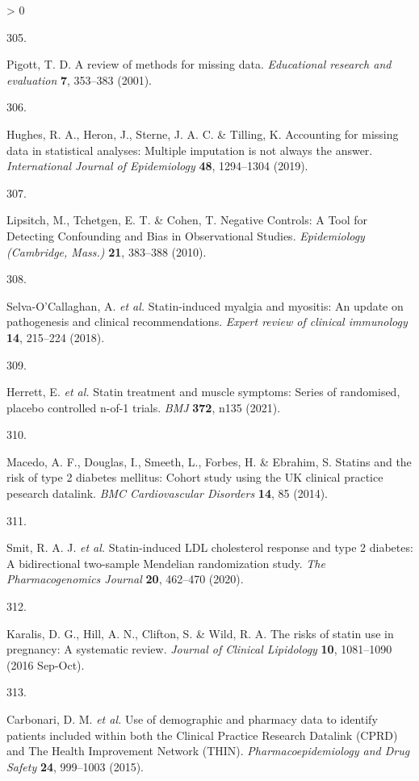 \documentclass[a4paper, twoside]{templates/ociamthesis}
\newlength{\cslhangindent}
\newlength{\csllabelwidth}
\newenvironment{CSLReferences}[3] %
 {%
  \setlength{\parindent}{0pt}
  \ifodd #1 \everypar{\setlength{\hangindent}{\cslhangindent}}\ignorespaces\fi
  \ifnum #2 > 0
  \setlength{\parskip}{#2\baselineskip}
  \fi
 }%
 {}
\newcommand{\CSLLeftMargin}[1]{\parbox[t]{\maxof{\widthof{#1}}{\csllabelwidth}}{#1}}
\newcommand{\CSLRightInline}[1]{\parbox[t]{\linewidth - \csllabelwidth}{#1}}
\begin{document}
\begin{CSLReferences}{0}{0}
\leavevmode\hypertarget{ref-pigott2001}{}%
\CSLLeftMargin{305. }
\CSLRightInline{Pigott, T. D. A review of methods for missing data. \emph{Educational research and evaluation} \textbf{7}, 353--383 (2001).}

\leavevmode\hypertarget{ref-hughes2019}{}%
\CSLLeftMargin{306. }
\CSLRightInline{Hughes, R. A., Heron, J., Sterne, J. A. C. \& Tilling, K. Accounting for missing data in statistical analyses: Multiple imputation is not always the answer. \emph{International Journal of Epidemiology} \textbf{48}, 1294--1304 (2019).}

\leavevmode\hypertarget{ref-lipsitch2010}{}%
\CSLLeftMargin{307. }
\CSLRightInline{Lipsitch, M., Tchetgen, E. T. \& Cohen, T. Negative {Controls}: A {Tool} for {Detecting Confounding} and {Bias} in {Observational Studies}. \emph{Epidemiology (Cambridge, Mass.)} \textbf{21}, 383--388 (2010).}

\leavevmode\hypertarget{ref-selva-ocallaghan2018}{}%
\CSLLeftMargin{308. }
\CSLRightInline{Selva-O'Callaghan, A. \emph{et al.} Statin-induced myalgia and myositis: An update on pathogenesis and clinical recommendations. \emph{Expert review of clinical immunology} \textbf{14}, 215--224 (2018).}

\leavevmode\hypertarget{ref-herrett2021}{}%
\CSLLeftMargin{309. }
\CSLRightInline{Herrett, E. \emph{et al.} Statin treatment and muscle symptoms: Series of randomised, placebo controlled n-of-1 trials. \emph{BMJ} \textbf{372}, n135 (2021).}

\leavevmode\hypertarget{ref-macedo2014}{}%
\CSLLeftMargin{310. }
\CSLRightInline{Macedo, A. F., Douglas, I., Smeeth, L., Forbes, H. \& Ebrahim, S. Statins and the risk of type 2 diabetes mellitus: Cohort study using the {UK} clinical practice pesearch datalink. \emph{BMC Cardiovascular Disorders} \textbf{14}, 85 (2014).}

\leavevmode\hypertarget{ref-smit2020}{}%
\CSLLeftMargin{311. }
\CSLRightInline{Smit, R. A. J. \emph{et al.} Statin-induced {LDL} cholesterol response and type 2 diabetes: A bidirectional two-sample {Mendelian} randomization study. \emph{The Pharmacogenomics Journal} \textbf{20}, 462--470 (2020).}

\leavevmode\hypertarget{ref-karalis2016}{}%
\CSLLeftMargin{312. }
\CSLRightInline{Karalis, D. G., Hill, A. N., Clifton, S. \& Wild, R. A. The risks of statin use in pregnancy: A systematic review. \emph{Journal of Clinical Lipidology} \textbf{10}, 1081--1090 (2016 Sep-Oct).}

\leavevmode\hypertarget{ref-carbonari2015}{}%
\CSLLeftMargin{313. }
\CSLRightInline{Carbonari, D. M. \emph{et al.} Use of demographic and pharmacy data to identify patients included within both the {Clinical Practice Research Datalink} ({CPRD}) and {The Health Improvement Network} ({THIN}). \emph{Pharmacoepidemiology and Drug Safety} \textbf{24}, 999--1003 (2015).}


\end{CSLReferences}
\end{document}
